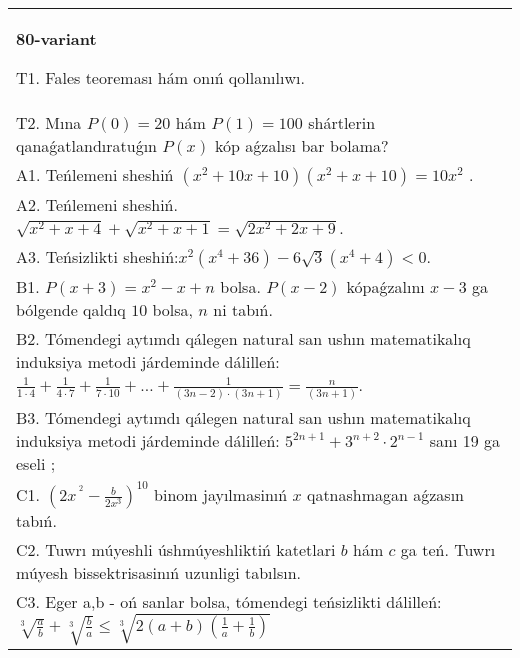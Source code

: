 \documentclass{article}
\begin{document}
\begin{tabular}{m{17cm}}
\textbf{80-variant}
\newline

T1. Fales teoreması hám onıń qollanılıwı. \\
T2. Mına \(P(0) = 20\) hám \(P(1) = 100\) shártlerin qanaǵatlandıratuǵın \(P(x)\) kóp aǵzalısı bar bolama? \\
A1. Teńlemeni sheshiń \(\left( x^{2} + 10x + 10 \right)\left( x^{2} + x + 10 \right) = 10x^{2}\) . \\
A2. Teńlemeni sheshiń. \(\sqrt{x^{2} + x + 4} + \sqrt{x^{2} + x + 1} = \sqrt{2x^{2} + 2x + 9}\). \\
A3. Teńsizlikti sheshiń:\(x^{2}\left( x^{4} + 36 \right) - 6\sqrt{3}\left( x^{4} + 4 \right) < 0\). \\
B1. \(P(x + 3) = x^{2} - x + n\) bolsa. \(P(x - 2)\) kópaǵzalını \(x - 3\) ga bólgende qaldıq \(10\) bolsa, \(n\) ni tabıń. \\
B2. Tómendegi aytımdı qálegen natural san ushın matematikalıq induksiya metodi járdeminde dálilleń: \(\frac{1}{1 \cdot 4} + \frac{1}{4 \cdot 7} + \frac{1}{7 \cdot 10} + \ldots + \frac{1}{(3n - 2) \cdot (3n + 1)} = \frac{n}{(3n + 1)}\). \\
B3. Tómendegi aytımdı qálegen natural san ushın matematikalıq induksiya metodi járdeminde dálilleń: \(5^{2n + 1} + 3^{n + 2} \cdot 2^{n - 1}\) sanı 19 ga eseli ; \\
C1. \(\left( 2x^{\ ^{2}} - \frac{b}{2x^{3}} \right)^{10}\) binom jayılmasinıń \(x\) qatnashmagan aǵzasın tabıń. \\
C2. Tuwrı múyeshli úshmúyeshliktiń katetlari \(b\) hám \(c\) ga teń. Tuwrı múyesh bissektrisasinıń uzunligi tabılsın. \\
C3. Eger a,b - oń sanlar bolsa, tómendegi teńsizlikti dálilleń: \(\sqrt[3]{\frac{a}{b}} + \sqrt[3]{\frac{b}{a}} \leq \sqrt[3]{2(a + b)\left( \frac{1}{a} + \frac{1}{b} \right)}\) \\

\end{tabular}
\vspace{1cm}
\end{document}
